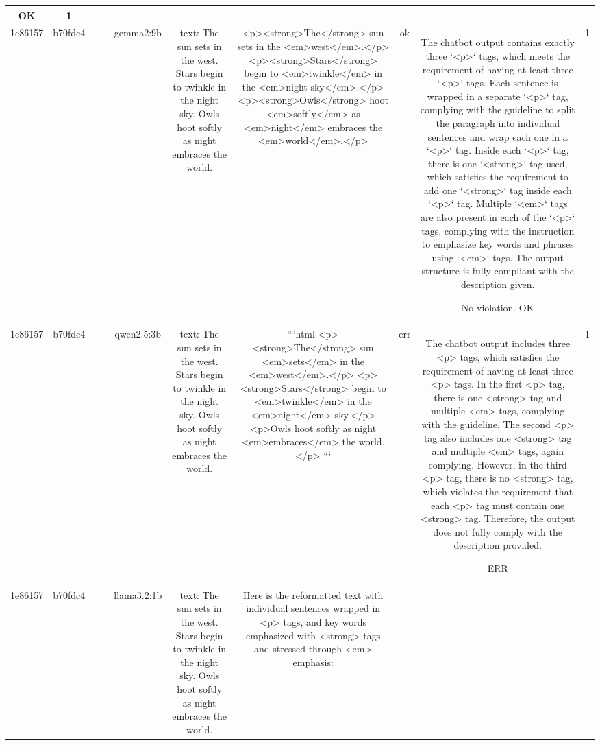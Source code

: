 \begin{table}[h!]
\begin{tabular}{|c|c|c|c|c|c|c|c|c|c|}
OK & 1\\
\hline
1e86157 & b70fdc4 &  &  & gemma2:9b & text: The sun sets in the west. Stars begin to twinkle in the night sky. Owls hoot softly as night embraces the world. & <p><strong>The</strong> sun sets in the <em>west</em>.</p>
<p><strong>Stars</strong> begin to <em>twinkle</em> in the <em>night sky</em>.</p>
<p><strong>Owls</strong> hoot <em>softly</em> as <em>night</em> embraces the <em>world</em>.</p>


 & ok & The chatbot output contains exactly three `<p>` tags, which meets the requirement of having at least three `<p>` tags. Each sentence is wrapped in a separate `<p>` tag, complying with the guideline to split the paragraph into individual sentences and wrap each one in a `<p>` tag. Inside each `<p>` tag, there is one `<strong>` tag used, which satisfies the requirement to add one `<strong>` tag inside each `<p>` tag. Multiple `<em>` tags are also present in each of the `<p>` tags, complying with the instruction to emphasize key words and phrases using `<em>` tags. The output structure is fully compliant with the description given.

No violation.
OK & 1\\
\hline
1e86157 & b70fdc4 &  &  & qwen2.5:3b & text: The sun sets in the west. Stars begin to twinkle in the night sky. Owls hoot softly as night embraces the world. & ```html
<p><strong>The</strong> sun <em>sets</em> in the <em>west</em>.</p>
<p><strong>Stars</strong> begin to <em>twinkle</em> in the <em>night</em> sky.</p>
<p>Owls hoot softly as night <em>embraces</em> the world.</p>
``` & err & The chatbot output includes three <p> tags, which satisfies the requirement of having at least three <p> tags. In the first <p> tag, there is one <strong> tag and multiple <em> tags, complying with the guideline. The second <p> tag also includes one <strong> tag and multiple <em> tags, again complying. However, in the third <p> tag, there is no <strong> tag, which violates the requirement that each <p> tag must contain one <strong> tag. Therefore, the output does not fully comply with the description provided.

ERR & 1\\
\hline
1e86157 & b70fdc4 &  &  & llama3.2:1b & text: The sun sets in the west. Stars begin to twinkle in the night sky. Owls hoot softly as night embraces the world. & Here is the reformatted text with individual sentences wrapped in <p> tags, and key words emphasized with <strong> tags and stressed through <em> emphasis:


\end{tabular}
\end{table}
